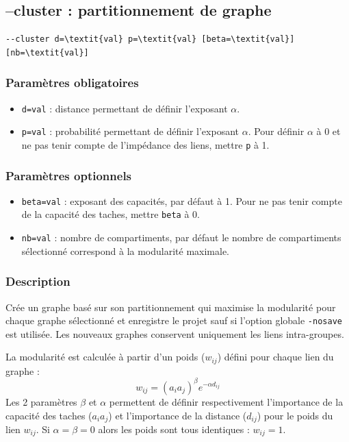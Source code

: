 \documentclass[a4paper,10pt]{report}
\begin{document}
\subsection{--cluster : partitionnement de graphe}
\begin{Verbatim}[commandchars=\\\{\}]
--cluster d=\textit{val} p=\textit{val} [beta=\textit{val}] [nb=\textit{val}]
\end{Verbatim}

\subsubsection{Paramètres obligatoires}
\begin{itemize}
	\item \verb|d=val| : distance permettant de définir l'exposant $\alpha$.
	\item \verb|p=val| : probabilité permettant de définir l'exposant $\alpha$. Pour définir $\alpha$ à 0 et ne pas tenir compte de l'impédance des liens, mettre \verb|p| à 1.
\end{itemize}

\subsubsection{Paramètres optionnels}
\begin{itemize}
	\item \verb|beta=val| : exposant des capacités, par défaut à 1. Pour ne pas tenir compte de la capacité des taches, mettre \verb|beta| à 0.
	\item \verb|nb=val| : nombre de compartiments, par défaut le nombre de compartiments sélectionné correspond à la modularité maximale.
\end{itemize}

\subsubsection{Description}
Crée un graphe basé sur son partitionnement qui maximise la modularité \cite{Newman2006} pour chaque graphe sélectionné et enregistre le projet sauf si l'option globale \verb|-nosave| est utilisée.
Les nouveaux graphes conservent uniquement les liens intra-groupes.

La modularité est calculée à partir d'un poids ($w_{ij}$) défini pour chaque lien du graphe :
$$w_{ij} = (a_i a_j)^\beta e^{-\alpha d_{ij}}$$
Les 2 paramètres $\beta$ et $\alpha$ permettent de définir respectivement l'importance de la capacité des taches ($a_i a_j$) et l'importance de la distance ($d_{ij}$) pour le poids du lien $w_{ij}$. Si $\alpha = \beta = 0$ alors les poids sont tous identiques : $w_{ij} = 1$.
\end{document}
